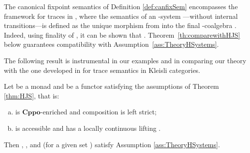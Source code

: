 \documentclass[oribibl,envcountsame,envcountsect,runningheads]{llncs}
\newcommand{\cat}[1]{\ensuremath{\mathbf{#1}}}
\newcommand{\cppo}{\cat{Cppo}}
\renewcommand{\>}{\rangle}
\begin{document}
\begin{remark} The canonical fixpoint semantics of Definition \ref{def:canfixSem} encompasses the framework for traces in \cite{HasuoJS:07}, where the semantics of an -system ---without internal transitions---is defined as the unique morphism  from  into the final -coalgebra . Indeed, using finality of , it can be shown that . Theorem~\ref{th:comparewithHJS} below guarantees compatibility with Assumption~\ref{ass:TheoryHSystems}.
\end{remark}
The following result is instrumental in our examples and in comparing our theory with the one developed in \cite{HasuoJS:07} for trace semantics in Kleisli categories.
\newcommand{\thcomparewithHJS}{Let  be a monad and  be a functor satisfying the assumptions of Theorem \ref{thm:HJS}, that is:
\begin{enumerate}[(a)]
 \item  is \cppo-enriched and composition is left strict;
 \item  is accessible and has a locally continuous lifting .
\end{enumerate}
Then , ,  and  (for a given set ) satisfy Assumption \ref{ass:TheoryHSystems}.}
\begin{theorem}\label{th:comparewithHJS}
\thcomparewithHJS
\end{theorem}
\end{document}
